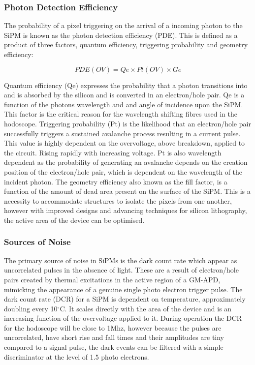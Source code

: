 \subsubsection*{Photon Detection Efficiency}

The probability of a pixel triggering on the arrival of a incoming photon to the SiPM is known as the photon detection efficiency (PDE). This is defined as a product of three factors, quantum efficiency, triggering probability and geometry efficiency: 

\[ PDE(OV) = Qe \times Pt(OV) \times Ge \]

Quantum efficiency (Qe) expresses the probability that a photon transitions into and is absorbed by the silicon and is converted in an electron/hole pair. Qe is a function of the photons wavelength and and angle of incidence upon the SiPM. This factor is the critical reason for the wavelength shifting fibres used in the hodoscope. Triggering probability (Pt) is the likelihood that an electron/hole pair successfully triggers a sustained avalanche process resulting in a current pulse. This value is highly dependent on the overvoltage, above breakdown, applied to the circuit. Rising rapidly with increasing voltage. Pt is also wavelength dependent as the probability of generating an avalanche depends on the creation position of the electron/hole pair, which is dependent on the wavelength of the incident photon. The geometry efficiency also known as the fill factor, is a function of the amount of dead area present on the surface of the SiPM. This is a necessity to accommodate structures to isolate the pixels from one another, however with improved designs and advancing techniques for silicon lithography, the active area of the device can be optimised.

\subsubsection*{Sources of Noise}

The primary source of noise in SiPMs is the dark count rate which appear as uncorrelated pulses in the absence of light. These are a result of electron/hole pairs created by thermal excitations in the active region of a GM-APD, mimicking the appearance of a genuine single photo electron trigger pulse. The dark count rate (DCR) for a SiPM is dependent on temperature, approximately doubling every 10$^{\circ}$C. It scales directly with the area of the device and is an increasing function of the overvoltage applied to it. During operation the DCR for the hodoscope will be close to 1Mhz, however because the pulses are uncorrelated, have short rise and fall times and their amplitudes are tiny compared to a signal pulse, the dark events can be filtered with a simple discriminator at the level of 1.5 photo electrons. \cite{website:AdvanSiDSiPMpdf}

